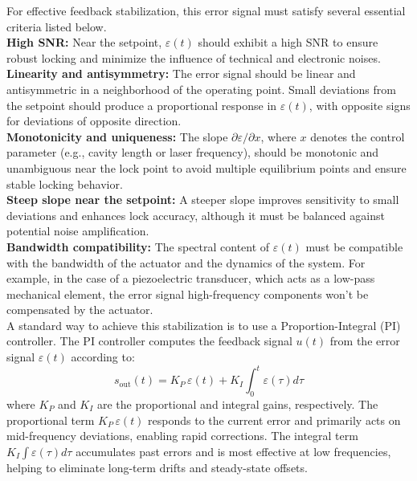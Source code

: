 For effective feedback stabilization, this error signal must satisfy several essential criteria listed below. \\ 

\noindent \textbf{High SNR: }
Near the setpoint, \( \varepsilon(t) \) should exhibit a high SNR to ensure robust locking and minimize the influence of technical and electronic noises. \\ 

\noindent \textbf{Linearity and antisymmetry: }
The error signal should be linear and antisymmetric in a neighborhood of the operating point. Small deviations from the setpoint should produce a proportional response in \( \varepsilon(t) \), with opposite signs for deviations of opposite direction. \\

\noindent \textbf{Monotonicity and uniqueness: }
The slope \( \partial \varepsilon / \partial x \), where \( x \) denotes the control parameter (e.g., cavity length or laser frequency), should be monotonic and unambiguous near the lock point to avoid multiple equilibrium points and ensure stable locking behavior. \\

\noindent \textbf{Steep slope near the setpoint: }
A steeper slope improves sensitivity to small deviations and enhances lock accuracy, although it must be balanced against potential noise amplification. \\

\noindent \textbf{Bandwidth compatibility: }
The spectral content of \( \varepsilon(t) \) must be compatible with the bandwidth of the actuator and the dynamics of the system. For example, in the case of a piezoelectric transducer, which acts as a low-pass mechanical element, the error signal high-frequency components won't be compensated by the actuator.  \\ 

A standard way to achieve this stabilization is to use a Proportion-Integral (PI) controller. The PI controller computes the feedback signal \( u(t) \) from the error signal \( \varepsilon(t) \) according to:
\begin{equation}
    s_{\text{out}}(t) = K_P \, \varepsilon(t) + K_I \int_0^t \varepsilon(\tau) d\tau
    \tag{III.1}
\end{equation}
where \( K_P \) and \( K_I \) are the proportional and integral gains, respectively. The proportional term \( K_P \, \varepsilon(t) \) responds to the current error and primarily acts on mid-frequency deviations, enabling rapid corrections. The integral term \( K_I \int \varepsilon(\tau) d\tau \) accumulates past errors and is most effective at low frequencies, helping to eliminate long-term drifts and steady-state offsets. \\ 

